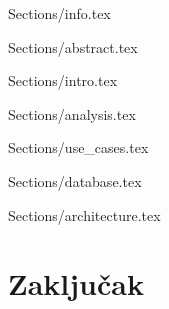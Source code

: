 \documentclass[12pt]{article}
\begin{document}
 {Sections/info.tex}
\maketitle

 {Sections/abstract.tex}

\tableofcontents

\newpage

 {Sections/intro.tex}

 {Sections/analysis.tex}

 {Sections/use_cases.tex}

 {Sections/database.tex}

 {Sections/architecture.tex}



\section{Zaključak}
\label{sec:zakljucak}


\appendix
 

\end{document}
